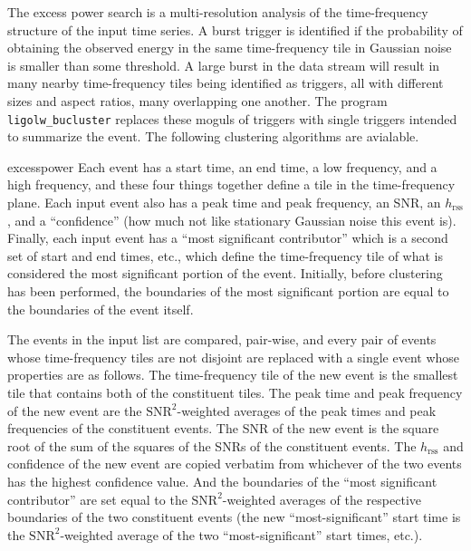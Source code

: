 \documentclass[10pt]{article}
\newcommand{\prog}[1]{\texttt{#1}}
\newenvironment{entry}%
{\begin{list}{}{\renewcommand{\makelabel}[1]%
{\parbox[b]{\labelwidth}{\makebox[0pt][l]{\textbf{##1}}\\}}%
\setlength{\labelwidth}{1em}%
\setlength{\labelsep}{1em}%
\setlength{\leftmargin}{2em}%
\setlength{\topsep}{\medskipamount}%
\setlength{\itemsep}{\medskipamount}%
\setlength{\parsep}{\medskipamount}%
\setlength{\listparindent}{0pt}}}
{\end{list}}
\begin{document}
The excess power search is a multi-resolution analysis of the
time-frequency structure of the input time series.  A burst trigger is
identified if the probability of obtaining the observed energy in the same
time-frequency tile in Gaussian noise is smaller than some threshold.  A
large burst in the data stream will result in many nearby time-frequency
tiles being identified as triggers, all with different sizes and aspect
ratios, many overlapping one another.  The program \prog{ligolw\_bucluster}
replaces these moguls of triggers with single triggers intended to
summarize the event.  The following clustering algorithms are avialable.
\begin{entry}
\item[excesspower]
Each event has a start time, an end time, a low frequency, and a high
frequency, and these four things together define a tile in the
time-frequency plane.  Each input event also has a peak time and peak
frequency, an SNR, an \(h_{\text{rss}}\), and a ``confidence'' (how much
not like stationary Gaussian noise this event is).  Finally, each input
event has a ``most significant contributor'' which is a second set of start
and end times, etc., which define the time-frequency tile of what is
considered the most significant portion of the event.  Initially, before
clustering has been performed, the boundaries of the most significant
portion are equal to the boundaries of the event itself.

The events in the input list are compared, pair-wise, and every pair of
events whose time-frequency tiles are not disjoint are replaced with a
single event whose properties are as follows.  The time-frequency tile of
the new event is the smallest tile that contains both of the constituent
tiles.  The peak time and peak frequency of the new event are the
\(\text{SNR}^{2}\)-weighted averages of the peak times and peak frequencies
of the constituent events.  The SNR of the new event is the square root of
the sum of the squares of the SNRs of the constituent events.  The
\(h_{\text{rss}}\) and confidence of the new event are copied verbatim from
whichever of the two events has the highest confidence value.  And the
boundaries of the ``most significant contributor'' are set equal to the
\(\text{SNR}^{2}\)-weighted averages of the respective boundaries of the
two constituent events (the new ``most-significant'' start time is the
\(\text{SNR}^{2}\)-weighted average of the two ``most-significant'' start
times, etc.).


\end{entry}
\end{document}
